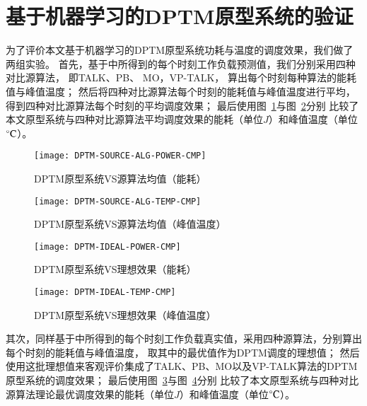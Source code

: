 \section{基于机器学习的DPTM原型系统的验证}
为了评价本文基于机器学习的DPTM原型系统功耗与温度的调度效果，我们做了两组实验。
首先，基于中所得到的每个时刻工作负载预测值，我们分别采用四种对比源算法， 即TALK、PB、 MO，VP-TALK， 算出每个时刻每种算法的能耗值与峰值温度； 然后将四种对比源算法每个时刻的能耗值与峰值温度进行平均，得到四种对比源算法每个时刻的平均调度效果； 最后使用图~\ref{fig:dptm-source-alg-power-cmp}与图~\ref{fig:dptm-source-alg-temp-cmp}分别 比较了本文原型系统与四种对比源算法平均调度效果的能耗（单位$J$）和峰值温度（单位$\celsius$）。

\begin{figure}[H]
  \centering
  \texttt{[image: DPTM-SOURCE-ALG-POWER-CMP]}
  \caption{DPTM原型系统VS源算法均值（能耗）}
  \label{fig:dptm-source-alg-power-cmp}
\end{figure}

\begin{figure}[H]
  \centering
  \texttt{[image: DPTM-SOURCE-ALG-TEMP-CMP]}
  \caption{DPTM原型系统VS源算法均值（峰值温度）}
  \label{fig:dptm-source-alg-temp-cmp}
\end{figure}

\begin{figure}[H]
  \centering
  \texttt{[image: DPTM-IDEAL-POWER-CMP]}
  \caption{DPTM原型系统VS理想效果（能耗）}
  \label{fig:dptm-ideal-power-cmp}
\end{figure}

\begin{figure}[H]
  \centering
  \texttt{[image: DPTM-IDEAL-TEMP-CMP]}
  \caption{DPTM原型系统VS理想效果（峰值温度）}
  \label{fig:dptm-ideal-temp-cmp}
\end{figure}


其次，同样基于中所得到的每个时刻工作负载真实值，采用四种源算法，分别算出每个时刻的能耗值与峰值温度， 取其中的最优值作为DPTM调度的理想值； 然后使用这批理想值来客观评价集成了TALK、PB、MO以及VP-TALK算法的DPTM原型系统的调度效果； 最后使用图~\ref{fig:dptm-ideal-power-cmp}与图~\ref{fig:dptm-ideal-temp-cmp}分别 比较了本文原型系统与四种对比源算法理论最优调度效果的能耗（单位$J$）和峰值温度（单位$\celsius$）。


